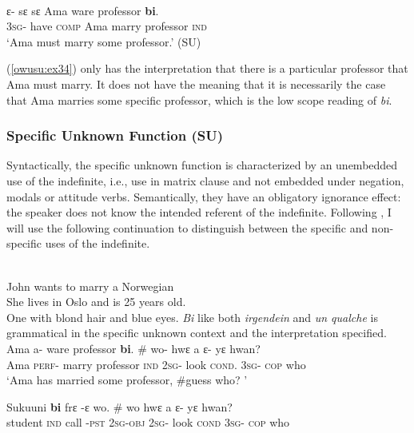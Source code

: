 \documentclass[output=paper,modfonts,nonflat,draftmode]{langsci/langscibook}
\begin{document}
\ea\label{owusu:ex34}\\
 \gll ε- sε  sε Ama ware professor \textbf{bi}.\\
\textsc{3sg}- have \textsc{comp} Ama marry professor \textsc{ind} \\
    
\glt `Ama must marry some professor.' (SU)

\z (\ref{owusu:ex34}) only has the interpretation that there is a particular professor that Ama must marry. It does not have the meaning that it is necessarily the case that Ama marries some specific professor, which is the low scope reading of \emph{bi}. 



\subsubsection{Specific Unknown Function (SU)}
Syntactically, the specific unknown function is characterized by an unembedded use of the indefinite, i.e., use in matrix clause and not embedded under negation, modals or attitude verbs. Semantically, they have an obligatory ignorance effect: the speaker does not know the intended referent of the indefinite. Following \citet{AloniPort2015}, I will use the following continuation to distinguish between the specific and non-specific uses of the indefinite.

\ea\label{owusu:ex40}\\
 John wants to marry a Norwegian\\
 \ea
 She lives in Oslo and is 25 years old.\\
\ex One with blond hair and blue eyes.
\z\z
\emph{Bi} like both \emph{irgendein} and \emph{un qualche} is grammatical in the specific unknown context  and the interpretation specified. 
\ea {}\\
\ea\label{owusu:ex42}
 \gll  Ama a- ware professor \textbf{bi}. \# wo- hwε a ε- yε hwan?\\
Ama \textsc{perf}- marry professor \textsc{ind} {} \textsc{2sg}- look  \textsc{cond}. \textsc{3sg}- \textsc{cop} who \\
    
\glt `Ama has married some professor, \#guess who? ' 

\ex 
\gll  Sukuuni \textbf{bi} frε -ε wo. \# wo hwε a ε- yε hwan?\\
student  \textsc{ind} call -\textsc{pst}       \textsc{2sg}-\textsc{obj} {} \textsc{2sg}- look  \textsc{cond} \textsc{3sg}- \textsc{cop} who\\
    
\end{document}
